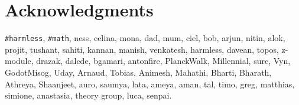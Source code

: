 \documentclass[11pt]{book}
\renewcommand{\baselinestretch}{1.2}
\begin{document}



\newpage
\thispagestyle{empty}
\renewcommand{\thesisdedication}{{\large Copyright \copyright~~Siddharth Bhat, 2021\\}{\large All Rights Reserved\\}}
\thesisdedicationpage



\newpage
\thispagestyle{empty}
\renewcommand{\thesisdedication}{\large To \texttt{\#math} \&\texttt{\#harmless}}
\thesisdedicationpage

\mastersthesis
\renewcommand{\baselinestretch}{1.5}

\chapter*{Acknowledgments}
\label{ch:ack}
\texttt{\#harmless}, \texttt{\#math}, ness, celina, mona, dad, mum, ciel, bob,
arjun, nitin, alok, projit, tushant, sahiti, kannan, manish, venkatesh, 
harmless, davean, topos, z-module, drazak, dalcde, bgamari, antonfire, PlanckWalk, Millennial, sure, Vyn, GodotMisog,  Uday, Arnaud, Tobias, Animesh, Mahathi, Bharti, Bharath, Athreya, Shaanjeet, auro, saumya, lata, ameya, aman, tal, timo, greg, matthias, simione, anastasia, theory group, luca, senpai. 


\end{document}
